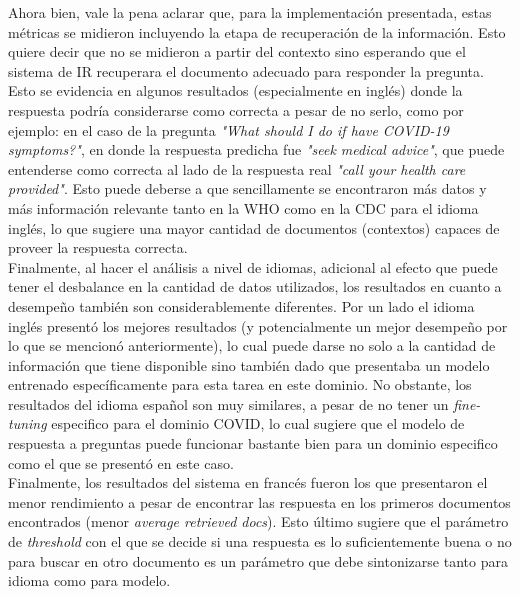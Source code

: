 Ahora bien, vale la pena aclarar que, para la implementación presentada, estas métricas se midieron incluyendo la etapa de recuperación de la información. Esto quiere decir que no se midieron a partir del contexto sino esperando que el sistema de IR recuperara el documento adecuado para responder la pregunta. Esto se evidencia en algunos resultados (especialmente en inglés) donde la respuesta podría considerarse como correcta a pesar de no serlo, como por ejemplo: en el caso de la pregunta \textit{"What should I do if have COVID-19 symptoms?"}, en donde la respuesta predicha fue \textit{"seek medical advice"}, que puede entenderse como correcta al lado de la respuesta real \textit{"call your health care provided"}. Esto puede deberse a que sencillamente se encontraron más datos y más información relevante tanto en la WHO como en la CDC para el idioma inglés, lo que sugiere una mayor cantidad de documentos (contextos) capaces de proveer la respuesta correcta. \\

Finalmente, al hacer el análisis a nivel de idiomas, adicional al efecto que puede tener el desbalance en la cantidad de datos utilizados, los resultados en cuanto a desempeño también son considerablemente diferentes. Por un lado el idioma inglés presentó los mejores resultados (y potencialmente un mejor desempeño por lo que se mencionó anteriormente), lo cual puede darse no solo a la cantidad de información que tiene disponible sino también dado que presentaba un modelo entrenado específicamente para esta tarea en este dominio. No obstante, los resultados del idioma español son muy similares, a pesar de no tener un \textit{fine-tuning} especifico para el dominio COVID, lo cual sugiere que el modelo de respuesta a preguntas puede funcionar bastante bien para un dominio especifico como el que se presentó en este caso. \\

Finalmente, los resultados del sistema en francés fueron los que presentaron el menor rendimiento a pesar de encontrar las respuesta en los primeros documentos encontrados (menor \textit{average retrieved docs}). Esto último sugiere que el parámetro de \textit{threshold} con el que se decide si una respuesta es lo suficientemente buena o no para buscar en otro documento es un parámetro que debe sintonizarse tanto para idioma como para modelo.

\newpage